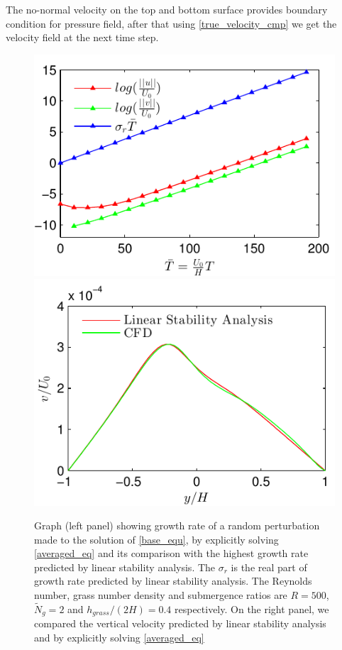 \documentclass[12pt]{report}   %
\newcommand{\Ndg}{\tilde{N}_g}
\begin{document}
The no-normal velocity on the top and bottom surface provides boundary condition for pressure field, after that using \eqref{true_velocity_cmp} we get the velocity field at the next time step.
\begin{figure}
\centerline{\includegraphics{LinearStabilityVsCFD1} \includegraphics{LinearStabilityVsCFD2}}
\caption{Graph (left panel) showing growth rate of a random perturbation made to the solution of \eqref{base_equ}, by explicitly solving \eqref{averaged_eq} and its comparison with the highest growth rate predicted by linear stability analysis. The $\sigma_r$ is the real part of growth rate predicted by linear stability analysis. The  Reynolds number, grass number density and submergence ratios are $R=500$, $\Ndg=2$ and $h_{grass}/(2H) = 0.4$ respectively. On the right panel, we compared the vertical velocity predicted by linear stability analysis and by explicitly solving \eqref{averaged_eq}}
\label{CFD_vs_LinearStability}
\end{figure}
%
\clearpage{\pagestyle{empty}\cleardoublepage}
\end{document}
